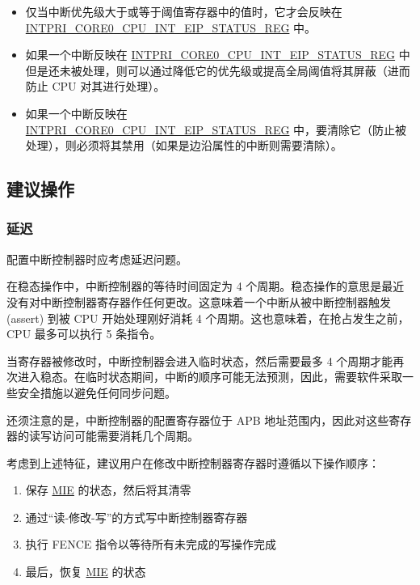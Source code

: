 \documentclass[main\_\_CN.tex]{subfiles}
\begin{document}
\begin{itemize}
    \item 仅当中断优先级大于或等于阈值寄存器中的值时，它才会反映在 \hyperref[regdesc:INTPRICORE0CPUINTEIPSTATUSREG]{INTPRI\_CORE0\_CPU\_INT\_EIP\_STATUS\_REG} 中。
    \item 如果一个中断反映在 \hyperref[regdesc:INTPRICORE0CPUINTEIPSTATUSREG]{INTPRI\_CORE0\_CPU\_INT\_EIP\_STATUS\_REG} 中但是还未被处理，则可以通过降低它的优先级或提高全局阈值将其屏蔽（进而防止 CPU 对其进行处理）。
    \item 如果一个中断反映在\\ \hyperref[regdesc:INTPRICORE0CPUINTEIPSTATUSREG]{INTPRI\_CORE0\_CPU\_INT\_EIP\_STATUS\_REG} 中，要清除它（防止被处理），则必须将其禁用（如果是边沿属性的中断则需要清除）。
\end{itemize}

\subsection{建议操作}
\label{sec:riscvcpu-int-suggest-op}

\subsubsection{延迟}
\label{sec:riscvcpu-int-latency}

配置中断控制器时应考虑延迟问题。

在稳态操作中，中断控制器的等待时间固定为 4 个周期。稳态操作的意思是最近没有对中断控制器寄存器作任何更改。这意味着一个中断从被中断控制器触发 (assert) 到被 CPU 开始处理刚好消耗 4 个周期。这也意味着，在抢占发生之前，CPU 最多可以执行 5 条指令。

当寄存器被修改时，中断控制器会进入临时状态，然后需要最多 4 个周期才能再次进入稳态。在临时状态期间，中断的顺序可能无法预测，因此，需要软件采取一些安全措施以避免任何同步问题。

还须注意的是，中断控制器的配置寄存器位于 APB 地址范围内，因此对这些寄存器的读写访问可能需要消耗几个周期。

考虑到上述特征，建议用户在修改中断控制器寄存器时遵循以下操作顺序：

\begin{enumerate}
    \item 保存 \hyperref[fielddesc:MSTATUSMIE]{MIE} 的状态，然后将其清零
    \item 通过“读-修改-写”的方式写中断控制器寄存器
    \item 执行 FENCE 指令以等待所有未完成的写操作完成
    \item 最后，恢复 \hyperref[fielddesc:MSTATUSMIE]{MIE} 的状态
\end{enumerate}
\end{document}
